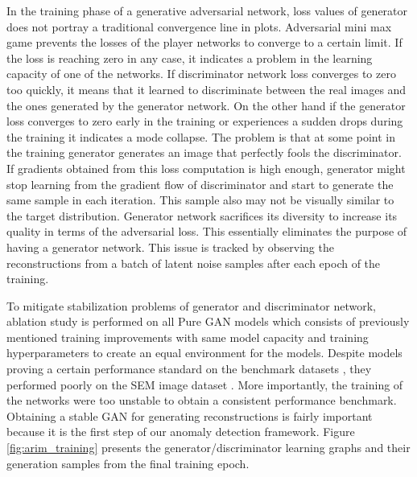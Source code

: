 In the training phase of a generative adversarial network, loss values of generator does not
portray a traditional convergence line in plots. Adversarial mini max game prevents the losses of the
player networks to converge to a certain limit. If the loss is reaching zero in any case, it
indicates a problem in the learning capacity of one of the networks. If discriminator network loss converges
to zero too quickly, it means that it learned to discriminate between the real images and the ones
generated by the generator network. On the other hand if the generator loss converges to zero early
in the training or experiences a sudden drops during the training it indicates a mode collapse. 
The problem is that at some point in the training generator generates an image that
perfectly fools the discriminator. If gradients obtained from this loss computation is high enough,
generator might stop learning from the gradient flow of discriminator and start to generate the same
sample in each iteration. This sample also may not be visually similar to the target distribution. Generator network 
sacrifices its diversity to increase its quality in terms of the adversarial loss.  
This essentially eliminates the purpose of having a generator network. This issue is 
tracked by observing the reconstructions from a batch of latent noise samples after each epoch of the 
training. 

To mitigate stabilization problems of generator and discriminator network, ablation study is 
performed on all Pure GAN models which consists of previously mentioned training improvements with 
same model capacity and training hyperparameters to create an equal environment for the models. 
Despite models proving a certain performance standard on the benchmark datasets \cite{cifar10,Netzer2011ReadingDI}, 
they performed poorly on the SEM image dataset \cite{sem}. More importantly, the training of 
the networks were too unstable to obtain a consistent performance benchmark. Obtaining a stable 
GAN for generating reconstructions is fairly important because it is the first step of our anomaly 
detection framework. Figure \ref{fig:arim_training} presents the generator/discriminator learning 
graphs and their generation samples from the final training epoch.

